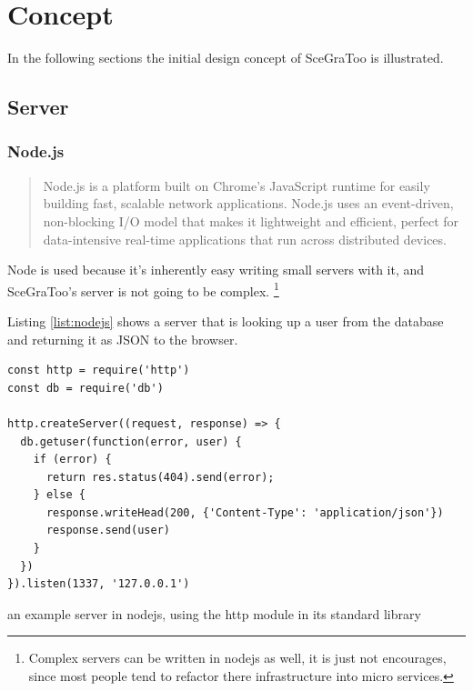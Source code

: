 
\section{Concept}
\label{concept}


In the following sections the initial design concept of SceGraToo is illustrated.

\subsection{Server}
\label{server}

\subsubsection{Node.js}
\begin{quote}
  Node.js is a platform built on Chrome's JavaScript runtime for easily building fast, scalable network applications. Node.js uses an event-driven, non-blocking I/O model that makes it lightweight and efficient, perfect for data-intensive real-time applications that run across distributed devices. \cite{nodejs}
\end{quote}

Node is used because it's inherently easy writing small servers with it, and
SceGraToo's server is not going to be complex. \footnote{Complex servers can be
written in nodejs as well, it is just not encourages, since most people tend to
refactor there infrastructure into micro services.}

Listing \ref{list:nodejs} shows a server that is looking up a user from the database and returning it as JSON to the browser.

\begin{listing}
  \begin{verbatim}
const http = require('http')
const db = require('db')

http.createServer((request, response) => {
  db.getuser(function(error, user) {
    if (error) {
      return res.status(404).send(error);
    } else {
      response.writeHead(200, {'Content-Type': 'application/json'})
      response.send(user)
    }
  })
}).listen(1337, '127.0.0.1')
  \end{verbatim}
  \caption{an example server in nodejs, using the http module in its standard library}
  \label{list:nodejs}
\end{listing}

